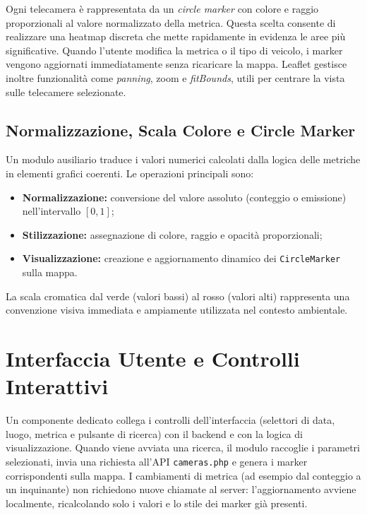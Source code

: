 \documentclass[12pt, oneside]{extbook}
\begin{document}
Ogni telecamera è rappresentata da un \emph{circle marker} con colore e raggio
proporzionali al valore normalizzato della metrica. Questa scelta consente di
realizzare una heatmap discreta che mette rapidamente in evidenza le aree più
significative. Quando l’utente modifica la metrica o il tipo di veicolo, i marker vengono
aggiornati immediatamente senza ricaricare la mappa. Leaflet gestisce inoltre
funzionalità come \emph{panning}, zoom e \emph{fitBounds}, utili per centrare la
vista sulle telecamere selezionate.

\subsection{Normalizzazione, Scala Colore e Circle Marker}

Un modulo ausiliario traduce i valori numerici calcolati dalla logica delle metriche
in elementi grafici coerenti. Le operazioni principali sono:

\begin{itemize}
\item \textbf{Normalizzazione:} conversione del valore assoluto (conteggio o
emissione) nell’intervallo $[0,1]$;
\item \textbf{Stilizzazione:} assegnazione di colore, raggio e opacità proporzionali;
\item \textbf{Visualizzazione:} creazione e aggiornamento dinamico dei
\texttt{CircleMarker} sulla mappa.
\end{itemize}

La scala cromatica dal verde (valori bassi) al rosso (valori alti) rappresenta una
convenzione visiva immediata e ampiamente utilizzata nel contesto ambientale.

\section{Interfaccia Utente e Controlli Interattivi}

Un componente dedicato collega i controlli dell'interfaccia (selettori di data,
luogo, metrica e pulsante di ricerca) con il backend e con la logica di
visualizzazione. Quando viene avviata una ricerca, il modulo raccoglie i parametri
selezionati, invia una richiesta all’API \texttt{cameras.php} e genera i marker
corrispondenti sulla mappa. I cambiamenti di metrica (ad esempio dal conteggio a un inquinante) non
richiedono nuove chiamate al server: l’aggiornamento avviene localmente,
ricalcolando solo i valori e lo stile dei marker già presenti.
\end{document}
